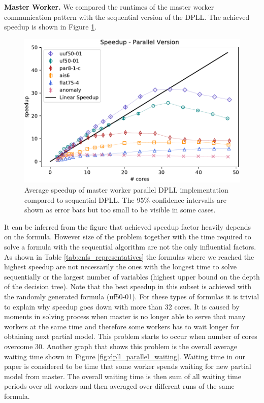 \documentclass[letterpaper]{article}
\newcommand{\mypar}[1]{{\bf #1.}}
\begin{document}
\mypar{Master Worker}
We compared the runtimes of the master worker communication pattern with the sequential version of the DPLL. The achieved speedup is shown in Figure \ref{fig:dpll_parallel_speedup}.
\begin{figure}
    \centering
    \includegraphics[width=\columnwidth]{figures/scaling_parallel_subset_dpll_scaling_tar.pdf}
    \caption{Average speedup of master worker parallel DPLL implementation compared to sequential DPLL.
    The 95\% confidence intervalls are shown as error bars but too small to be visible in some cases.
    \label{fig:dpll_parallel_speedup}}
\end{figure}
It can be inferred from the figure that achieved speedup factor heavily depends on the formula.
However size of the problem together with the time required to solve a formula with the sequential algorithm are not the only influential factors. 
As shown in Table \ref{tab:cnfs_representatives} the formulas where we reached the highest speedup are not necessarily the ones with the longest time to solve sequentially or the largest number of variables (highest upper bound on the depth of the decision tree).
Note that the best speedup in this subset is achieved with the randomly generated formula (uf50-01).
For these types of formulas it is trivial to explain why speedup goes down with more than 32 cores.
It is caused by moments in solving process when master is no longer able to serve that many workers at the same time and therefore some workers has to wait longer for obtaining next partial model. This problem starts to occur when number of cores overcome 30. 
Another graph that shows this problem is the overall average waiting time shown in Figure \ref{fig:dpll_parallel_waiting}.
Waiting time in our paper is considered to be time that some worker spends waiting for new partial model from master.
The overall waiting time is then sum of all waiting time periods over all workers and then averaged over different runs of the same formula.
\end{document}

